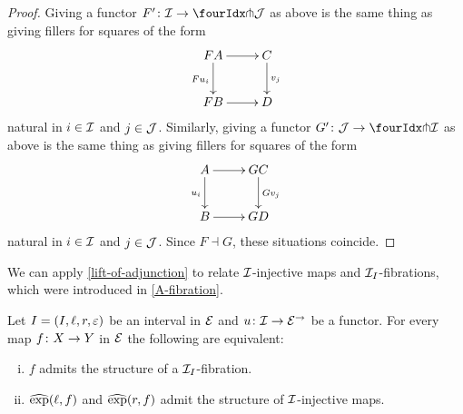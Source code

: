 \documentclass[reqno,10pt,a4paper,oneside]{amsart}
\begin{document}
\begin{proof} Giving a functor $F' \co \cal{I} \to \liftl{\cal{J}}$ as above is the same thing as giving fillers for squares of the form
\[
\xymatrix{
FA \ar[d]_{F u_i} \ar[r] & C \ar[d]^{v_j} \\
FB \ar[r] & D }
\]
natural in $i  \in \cal{I}$ and $j \in \cal{J}$. Similarly, giving a functor $G' \co \cal{J} \to \liftl{\cal{I}}$ as above is the same thing as giving fillers for squares 
of the form
\[
\xymatrix{
A \ar[d]_{u_i} \ar[r] & GC \ar[d]^{Gv_j} \\
B \ar[r] & GD }
\]
 natural in $i \in \cal{I}$ and $j \in \cal{J}$. Since $F \dashv G$, these situations coincide.
\end{proof}

We can apply \cref{lift-of-adjunction} to relate $\cal{I}$-injective maps and 
 $\cal{I}_\interval$-fibrations, which were introduced in \cref{A-fibration}.


\begin{corollary} \label{prod-exp-general}
Let $\interval = (\interval, \intervall, \intervalr, \varepsilon)$ be an interval in $\catE$ and
 $u \co \cal{I} \to \catE^\to$ be a functor. For every map $f \co X \to Y$ in $\cal{E}$ 
 the following are equivalent: 
\begin{enumerate}[(i)]
\item $f$ admits the structure of a $\cal{I}_\interval$-fibration. 
\item $\hatexp(\intervall, f)$ and $\hatexp(\intervalr, f)$ admit the structure of $\cal{I}$-injective maps.
\end{enumerate} 
\end{corollary}


\medskip
\end{document}
